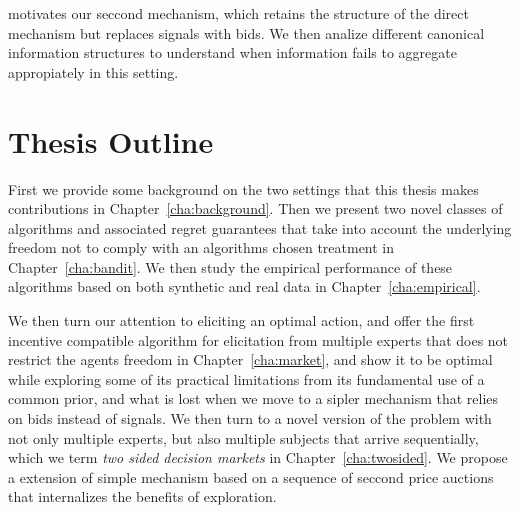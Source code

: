 motivates our seccond mechanism, which retains the structure of the direct mechanism but replaces signals with bids. We then analize different canonical information structures to understand when information fails to aggregate appropiately in this setting. 


\section{Thesis Outline}
\label{sec:outline}

First we provide some background on the two settings that this thesis makes contributions in  Chapter~\ref{cha:background}. Then we present two novel classes of algorithms and associated regret guarantees that take into account the underlying freedom not to comply with an algorithms chosen treatment in Chapter~\ref{cha:bandit}. We then study the empirical performance  of these algorithms based on both synthetic and real data in Chapter~\ref{cha:empirical}. 

We then turn our attention to eliciting an optimal action, and offer the first incentive compatible algorithm for elicitation from multiple experts that does not restrict the agents freedom in Chapter~\ref{cha:market}, and show it to be optimal while exploring some of its practical limitations from its fundamental use of a common prior, and what is lost when we move to a sipler mechanism that relies on bids instead of signals. We then turn to a novel version of the problem with not only multiple experts, but also multiple subjects that arrive sequentially, which we term \emph{two sided decision markets} in Chapter~\ref{cha:twosided}. We propose a extension of simple mechanism based on a sequence of seccond price auctions that internalizes the benefits of exploration.

